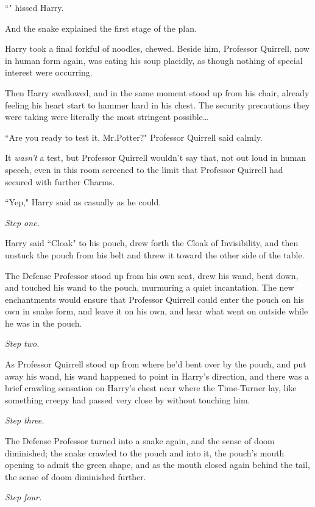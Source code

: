 ``" hissed Harry.

And the snake explained the first stage of the plan.

\later

Harry took a final forkful of noodles, chewed. Beside him, Professor Quirrell, now in human form again, was eating his soup placidly, as though nothing of special interest were occurring.

Then Harry swallowed, and in the same moment stood up from his chair, already feeling his heart start to hammer hard in his chest. The security precautions they were taking were literally the most stringent possible{\ldots}

``Are you ready to test it, Mr.\?Potter?" Professor Quirrell said calmly.

It \emph{wasn't} a test, but Professor Quirrell wouldn't say that, not out loud in human speech, even in this room screened to the limit that Professor Quirrell had secured with further Charms.

``Yep," Harry said as casually as he could.

\emph{Step one.}

Harry said ``Cloak" to his pouch, drew forth the Cloak of Invisibility, and then unstuck the pouch from his belt and threw it toward the other side of the table.

The Defense Professor stood up from his own seat, drew his wand, bent down, and touched his wand to the pouch, murmuring a quiet incantation. The new enchantments would ensure that Professor Quirrell could enter the pouch on his own in snake form, and leave it on his own, and hear what went on outside while he was in the pouch.

\emph{Step two.}

As Professor Quirrell stood up from where he'd bent over by the pouch, and put away his wand, his wand happened to point in Harry's direction, and there was a brief crawling sensation on Harry's chest near where the Time-Turner lay, like something creepy had passed very close by without touching him.

\emph{Step three.}

The Defense Professor turned into a snake again, and the sense of doom diminished; the snake crawled to the pouch and into it, the pouch's mouth opening to admit the green shape, and as the mouth closed again behind the tail, the sense of doom diminished further.

\emph{Step four.}


